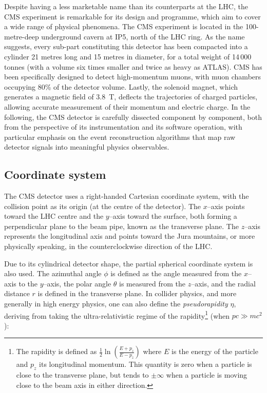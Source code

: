 Despite having a less marketable name than its counterparts at the LHC, the CMS experiment \cite{CMS_detector} is remarkable for its design and programme, which aim to cover a wide range of physical phenomena. The CMS experiment is located in the 100-metre-deep underground cavern at IP5, north of the LHC ring. As the name suggests, every sub-part constituting this detector has been compacted into a cylinder 21 metres long and 15 metres in diameter, for a total weight of 14\,000 tonnes (with a volume six times smaller and twice as heavy as ATLAS). CMS has been specifically designed to detect high-momentum muons, with muon chambers occupying 80\% of the detector volume. Lastly, the solenoid magnet, which generates a magnetic field of 3.8~T, deflects the trajectories of charged particles, allowing accurate measurement of their momentum and electric charge. In the following, the CMS detector is carefully dissected component by component, both from the perspective of its instrumentation and its software operation, with particular emphasis on the event reconstruction algorithms that map raw detector signals into meaningful physics observables.

\subsection{Coordinate system}

The CMS detector uses a right-handed Cartesian coordinate system, with the collision point as its origin (at the centre of the detector). The $x$--axis points toward the LHC centre and the $y$--axis toward the surface, both forming a perpendicular plane to the beam pipe, known as the transverse plane. The $z$--axis represents the longitudinal axis and points toward the Jura mountains, or more physically speaking, in the counterclockwise direction of the LHC.

Due to its cylindrical detector shape, the partial spherical coordinate system is also used. The azimuthal angle $\phi$ is defined as the angle measured from the $x$--axis to the $y$--axis, the polar angle $\theta$ is measured from the $z$--axis, and the radial distance $r$ is defined in the transverse plane. In collider physics, and more generally in high energy physics, one can also define the \textit{pseudorapidity} $\eta$, deriving from taking the ultra-relativistic regime of the rapidity\footnote{The rapidity is defined as $\frac{1}{2}\ln\left( \frac{E+p_z}{E-p_z} \right)$ where $E$ is the energy of the particle and $p_z$ its longitudinal momentum. This quantity is zero when a particle is close to the transverse plane, but tends to $\pm\infty$ when a particle is moving close to the beam axis in either direction.} (when $pc\gg mc^2$):


